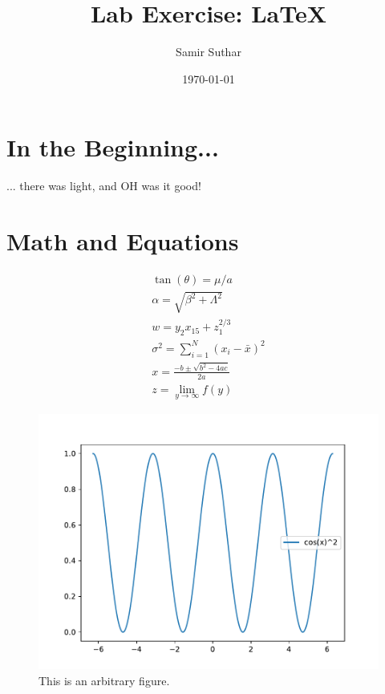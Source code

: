 \documentclass[aps,12pt]{revtex4}
\begin{document}
\title{Lab Exercise: LaTeX}

\author{Samir Suthar}


\date{\today}

\maketitle

\section{In the Beginning...}
\label{sec:level1}

... there was light, and OH was it good!

\section{Math and Equations}
\begin{eqnarray}
\tan(\theta) = \mu/a \label{appa}
\\
\alpha = \sqrt{\beta^2 + \Lambda^2}
\\
w = y_2x_{15} + z_1^{2/3}
\\
\sigma^2 = \sum_{i=1}^N(x_i - \bar x)^2
\\
 x = \frac{-b \pm \sqrt{b^2 - 4ac}}{2a}
\\
z = \lim_{y \rightarrow \infty}f(y)
\end{eqnarray}

\begin{figure}[h]
\centerline{
\includegraphics[width=4.5in]{cosX_sqr.pdf}
}
\caption{This is an arbitrary figure.}\label{fig:arb}
\end{figure}
\end{document}
